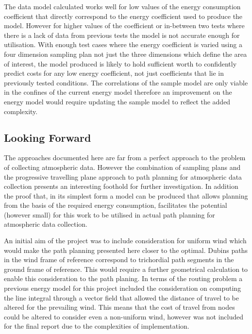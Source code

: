 \documentclass[a4paper,12pt,twoside]{article}
\begin{document}
The data model calculated works well for low values of the energy consumption coefficient that directly correspond to the energy coefficient used to produce the model. However for higher values of the coefficient or in-between two tests where there is a lack of data from previous tests the model is not accurate enough for utilisation. With enough test cases where the energy coefficient is varied using a four dimension sampling plan not just the three dimensions which define the area of interest, the model produced is likely to hold sufficient worth to confidently predict costs for any low energy coefficient, not just coefficients that lie in previously tested conditions. The correlations of the sample model are only viable in the confines of the current energy model therefore an improvement on the energy model would require updating the sample model to reflect the added complexity.

\subsection{Looking Forward}
\label{sec:looking_forward}

The approaches documented here are far from a perfect approach to the problem of collecting atmospheric data. However the combination of sampling plans and the progressive travelling plane approach to path planning for atmospheric data collection presents an interesting foothold for further investigation. In addition the proof that, in its simplest form a model can be produced that allows planning from the basis of the required energy consumption, facilitates the potential (however small) for this work to be utilised in actual path planning for atmospheric data collection.

An initial aim of the project was to include consideration for uniform wind which would make the path planning presented here closer to the optimal. Dubins paths in the wind frame of reference correspond to trichordial path segments in the ground frame of reference. This would require a further geometrical calculation to enable this consideration to the path planing. In terms of the routing problem a previous energy model for this project included the consideration on computing the line integral through a vector field that allowed the distance of travel to be altered for the prevailing wind. This means that the cost of travel from nodes could be altered to consider even a non-uniform wind, however was not included for the final report due to the complexities of implementation.
\end{document}
